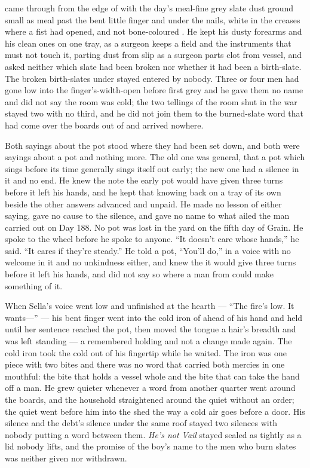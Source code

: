  came through from the edge of  with the day's meal-fine grey slate dust ground small as meal past the bent little finger and under the nails, white in the creases where a fist had opened, and not bone-coloured . He kept his dusty forearms and his clean ones on one tray, as a surgeon keeps a field and the instruments that must not touch it, parting dust from slip as a surgeon parts clot from vessel, and asked neither which slate had been broken nor whether it had been a birth-slate. The broken birth-slates under  stayed entered by nobody. Three or four men had gone low into the finger's-width-open  before first grey and he gave them no name and did not say the room was cold; the two tellings of the room shut in the war stayed two with no third, and he did not join them to the burned-slate word that had come over the boards out of  and arrived nowhere.

Both sayings about the pot stood where they had been set down, and both were sayings about a pot and nothing more. The old one was general, that a pot which sings before its time generally sings itself out early; the new one had a silence in it and no end. He knew the note the early pot would have given three turns before it left his hands, and he kept that knowing back on a tray of its own beside the other answers advanced and unpaid. He made no lesson of either saying, gave no cause to the silence, and gave no name to what ailed the man carried out on Day 188. No pot was lost in the yard on the fifth day of Grain. He spoke to the wheel before he spoke to anyone. “It doesn't care whose hands,” he said. “It cares if they're steady.” He told a pot, “You'll do,” in a voice with no welcome in it and no unkindness either, and knew the  it would give three turns before it left his hands, and did not say so where a man from  could make something of it.

When Sella's voice went low and unfinished at the hearth --- “The fire's low. It wants---” --- his bent finger went into the cold iron of  ahead of his hand and held until her sentence reached the pot, then moved the tongue a hair's breadth and was left standing --- a remembered holding and not a change made again. The cold iron took the cold out of his fingertip while he waited. The iron was one piece with two bites and there was no  word that carried both mercies in one mouthful: the bite that holds a vessel whole and the bite that can take the hand off a man. He grew quieter whenever a word from another quarter went around the boards, and the household straightened around the quiet without an order; the quiet went before him into the shed the way a cold air goes before a door. His silence and the debt's silence under the same roof stayed two silences with nobody putting a word between them. \emph{He's not Vail} stayed sealed as tightly as a lid nobody lifts, and the promise of the boy's name to the men who burn slates was neither given nor withdrawn.

